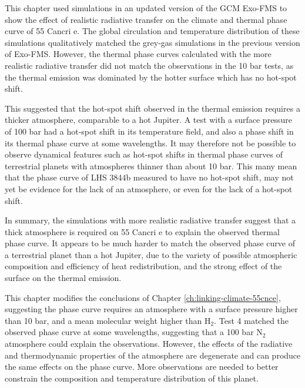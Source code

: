 This chapter used simulations in an updated version of the GCM Exo-FMS to show the effect of realistic radiative transfer on the climate and thermal phase curve of 55 Cancri e. The global circulation and temperature distribution of these simulations qualitatively matched the grey-gas simulations in the previous version of Exo-FMS. However, the thermal phase curves calculated with the more realistic radiative transfer did not match the observations in the 10 bar tests, as the thermal emission was dominated by the hotter surface which has no hot-spot shift.


This suggested that the hot-spot shift observed in the thermal emission requires a thicker atmosphere, comparable to a hot Jupiter. A test with a surface pressure of 100 bar had a hot-spot shift in its temperature field, and also a phase shift in its thermal phase curve at some wavelengths. It may therefore not be possible to observe dynamical features such as hot-spot shifts in thermal phase curves of terrestrial planets with atmospheres thinner than about 10 bar. This many mean that the phase curve of LHS 3844b measured \citet{kreidberg2019lhs} to have no hot-spot shift, may not yet be evidence for the lack of an atmosphere, or even for the lack of a hot-spot shift.


In summary, the simulations with more realistic radiative transfer suggest that a thick atmosphere is required on 55 Cancri e to explain the observed thermal phase curve. It appears to be much harder to match the observed phase curve of a terrestrial planet than a hot Jupiter, due to the variety of possible atmospheric composition and efficiency of heat redistribution, and the strong effect of the surface on the thermal emission.

This chapter modifies the conclusions of Chapter \ref{ch:linking-climate-55cnce}, suggesting the phase curve requires an atmosphere with a surface pressure higher than 10 bar, and a mean molecular weight higher than H$_{2}$. Test 4 matched the observed phase curve at some wavelengths, suggesting that a 100 bar N$_{2}$ atmosphere could explain the observations. However, the effects of the radiative and thermodynamic properties of the atmosphere are degenerate and can produce the same effects on the phase curve. More observations are needed to better constrain the composition and temperature distribution of this planet.





% 
% 
